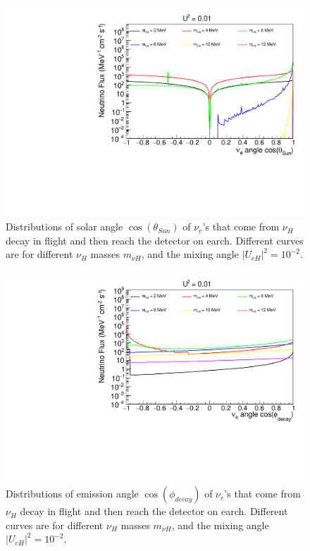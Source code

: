 \documentclass[%
 reprint,
 amsmath,amssymb,
 aps,
 prd,
twocolumn,
]{revtex4-1}
\begin{document}
\begin{figure}[!ht]
\includegraphics[width=0.99\columnwidth]{../plots/DecayInFlightNuLCosthetaSun_U0.01_AllMass_linXlogY.pdf}
\caption{Distributions of solar angle $\cos(\theta_{Sun})$ of $\nu_e$'s that come from $\nu_H$ decay in flight and then reach the detector on earch. Different curves are for different $\nu_H$ masses $m_{\nu H}$, and the mixing angle $|U_{eH}|^2 = 10^{-2}$.}
\label{fig:DecayInFlightTheta_U1em2_AllMass}
\end{figure}

\begin{figure}[!ht]
\includegraphics[width=0.99\columnwidth]{../plots/DecayInFlightNuLCosphiSun_U0.01_AllMass_linXlogY.pdf}
\caption{Distributions of emission angle $\cos(\phi_{decay})$ of $\nu_e$'s that come from $\nu_H$ decay in flight and then reach the detector on earch. Different curves are for different $\nu_H$ masses $m_{\nu H}$, and the mixing angle $|U_{eH}|^2 = 10^{-2}$.}
\label{fig:DecayInFlightPhi_U1em2_AllMass}
\end{figure}
\end{document}
